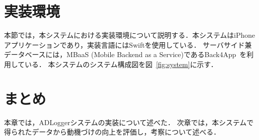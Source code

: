 \section{実装環境}
本節では，本システムにおける実装環境について説明する．本システムはiPhoneアプリケーションであり，実装言語にはSwiftを使用している．
サーバサイド兼データベースには，MBaaS (Mobile Backend as a Service)であるBack4App~\cite{back4app}を利用している．
本システムのシステム構成図を図~\ref{fig:system}に示す．

\section{まとめ}
本章では，ADLoggerシステムの実装について述べた．
次章では，本システムで得られたデータから動機づけの向上を評価し，考察について述べる．
